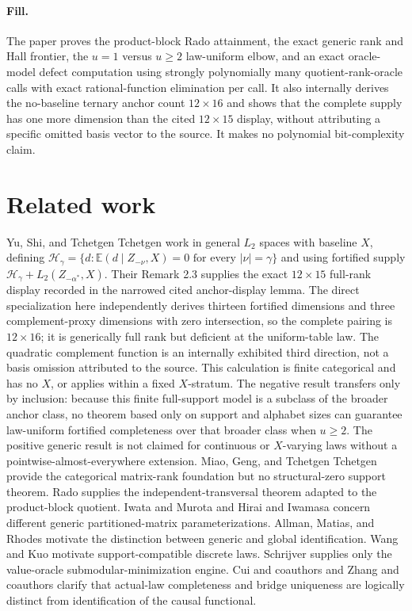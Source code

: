 \documentclass{article}
\begin{document}
\paragraph{Fill.} The paper proves the product-block Rado attainment, the exact generic rank and Hall frontier, the \(u=1\) versus \(u\geq2\) law-uniform elbow, and an exact oracle-model defect computation using strongly polynomially many quotient-rank-oracle calls with exact rational-function elimination per call. It also internally derives the no-baseline ternary anchor count \(12\times16\) and shows that the complete supply has one more dimension than the cited \(12\times15\) display, without attributing a specific omitted basis vector to the source. It makes no polynomial bit-complexity claim.

\section{Related work}

Yu, Shi, and Tchetgen Tchetgen work in general \(L_2\) spaces with baseline \(X\), defining \(\mathcal H_\gamma=\{d:\mathbb E(d\mid Z_{-\nu},X)=0\text{ for every }|\nu|=\gamma\}\) and using fortified supply \(\mathcal H_\gamma+L_2(Z_{-\alpha^*},X)\). Their Remark 2.3 supplies the exact \(12\times15\) full-rank display recorded in the narrowed cited anchor-display lemma. The direct specialization here independently derives thirteen fortified dimensions and three complement-proxy dimensions with zero intersection, so the complete pairing is \(12\times16\); it is generically full rank but deficient at the uniform-table law. The quadratic complement function is an internally exhibited third direction, not a basis omission attributed to the source. This calculation is finite categorical and has no \(X\), or applies within a fixed \(X\)-stratum. The negative result transfers only by inclusion: because this finite full-support model is a subclass of the broader anchor class, no theorem based only on support and alphabet sizes can guarantee law-uniform fortified completeness over that broader class when \(u\geq2\). The positive generic result is not claimed for continuous or \(X\)-varying laws without a pointwise-almost-everywhere extension. Miao, Geng, and Tchetgen Tchetgen provide the categorical matrix-rank foundation but no structural-zero support theorem. Rado supplies the independent-transversal theorem adapted to the product-block quotient. Iwata and Murota and Hirai and Iwamasa concern different generic partitioned-matrix parameterizations. Allman, Matias, and Rhodes motivate the distinction between generic and global identification. Wang and Kuo motivate support-compatible discrete laws. Schrijver supplies only the value-oracle submodular-minimization engine. Cui and coauthors and Zhang and coauthors clarify that actual-law completeness and bridge uniqueness are logically distinct from identification of the causal functional.
\end{document}
